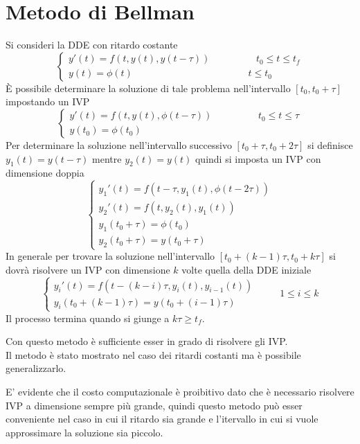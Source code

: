 \section{Metodo di Bellman}
Si consideri la DDE con ritardo costante
$$
\begin{cases}
 y'(t) = f(t,y(t),y(t- \tau))		\hspace{2cm}	t_0 \le t \le t_f \\
 y(t)=\phi(t)				\hspace{5cm}	t \le t_0
\end{cases}
$$
È possibile determinare la soluzione di tale problema nell'intervallo 
$[t_0,t_0+\tau]$ impostando un IVP
$$
\begin{cases}
 y'(t) = f(t,y(t),\phi(t- \tau))			\hspace{2cm}	t_0 \le t \le \tau \\
 y(t_0)=\phi(t_0)				
\end{cases}
$$
Per determinare la soluzione nell'intervallo successivo $[t_0+\tau , t_0 + 2 \tau]$ si definisce 
$y_1(t)=y(t-\tau)$ mentre $y_2(t)=y(t)$ quindi si imposta un IVP con dimensione doppia
$$
\begin{cases}
 y_1'(t)=f(t-\tau, y_1(t),\phi(t-2 \tau))				\\
 y_2'(t)=f(t,y_2(t),y_1(t))						\\
 y_1 (t_0 + \tau) = \phi(t_0)						\\
 y_2 (t_0 + \tau) = y(t_0+\tau)
\end{cases}
$$
In generale per trovare la soluzione nell'intervallo $[t_0+(k-1)\tau,t_0+k \tau]$ si dovrà risolvere 
un IVP con dimensione $k$ volte quella della DDE iniziale
$$
\begin{cases}
 y_i'(t)=f(t-(k-i) \tau, y_i(t), y_{i-1}(t)) \\
 y_i(t_0+(k-1)\tau) = y(t_0 + (i-1) \tau)
\end{cases} \hspace{1cm}
1 \le i	\le k
$$
Il processo termina quando si giunge a $k \tau \geq t_f$.

\vspace{0.4cm}

Con questo metodo è sufficiente esser in grado di risolvere gli IVP.\\
Il metodo è stato mostrato nel caso dei ritardi costanti ma è possibile generalizzarlo.

\vspace{0.3cm}

E' evidente che il costo computazionale è proibitivo dato che è necessario risolvere 
IVP a dimensione sempre più grande, quindi questo metodo può esser conveniente nel caso in cui 
il ritardo sia grande e l'itervallo in cui si vuole approssimare la soluzione sia piccolo.



